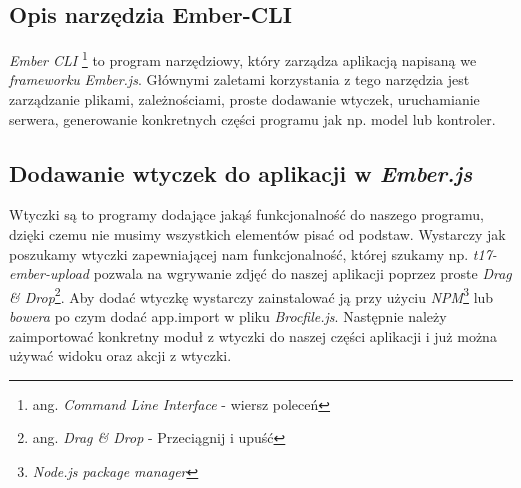 \documentclass[openright]{xmgr}
\begin{document}
\subsection{Opis narzędzia Ember-CLI}
\textit{Ember CLI} \footnote{ang. \textit{Command Line Interface} - wiersz poleceń} to program narzędziowy, który zarządza aplikacją napisaną we \textit{frameworku} \textit{Ember.js}. Głównymi zaletami korzystania z tego narzędzia jest zarządzanie plikami, zależnościami, proste dodawanie wtyczek, uruchamianie serwera, generowanie konkretnych części programu jak np. model lub kontroler.

\subsection{Dodawanie wtyczek do aplikacji w \textit{Ember.js}}
Wtyczki są to programy dodające jakąś funkcjonalność do naszego programu, dzięki czemu nie musimy wszystkich elementów pisać od podstaw. Wystarczy jak poszukamy wtyczki zapewniającej nam funkcjonalność, której szukamy np. \textit{t17-ember-upload} pozwala na wgrywanie zdjęć do naszej aplikacji poprzez proste \textit{Drag \& Drop}\footnote{ang. \textit{Drag \& Drop} -  Przeciągnij i upuść}. Aby dodać wtyczkę wystarczy zainstalować ją przy użyciu \textit{NPM}\footnote{\textit{Node.js package manager}} lub \textit{bowera}  po czym dodać app.import w pliku \textit{Brocfile.js}. Następnie należy zaimportować konkretny moduł z wtyczki do naszej części aplikacji i już można używać widoku oraz akcji z wtyczki.
\end{document}
